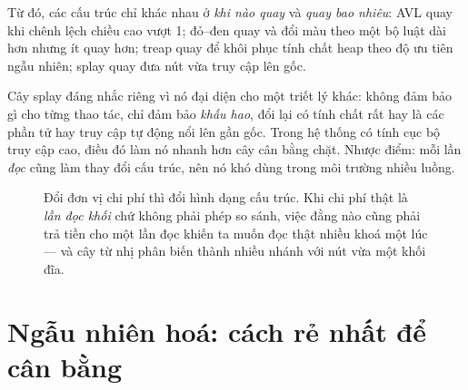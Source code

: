 \documentclass[../../algorithm.tex]{subfiles}
\begin{document}
Từ đó, các cấu trúc chỉ khác nhau ở \emph{khi nào quay} và \emph{quay bao nhiêu}: AVL quay khi chênh lệch chiều cao vượt 1; đỏ--đen quay và đổi màu theo một bộ luật dài hơn nhưng ít quay hơn; treap quay để khôi phục tính chất heap theo độ ưu tiên ngẫu nhiên; splay quay đưa nút vừa truy cập lên gốc.

Cây splay đáng nhắc riêng vì nó đại diện cho một triết lý khác\cite{sleator1985}: không đảm bảo gì cho từng thao tác, chỉ đảm bảo  \emph{khấu hao}, đổi lại có tính chất rất hay là các phần tử hay truy cập tự động nổi lên gần gốc. Trong hệ thống có tính cục bộ truy cập cao, điều đó làm nó nhanh hơn cây cân bằng chặt. Nhược điểm: mỗi lần \emph{đọc} cũng làm thay đổi cấu trúc, nên nó khó dùng trong môi trường nhiều luồng.

\begin{figure}[H]\centering
{}
\caption{Đổi đơn vị chi phí thì đổi hình dạng cấu trúc. Khi chi phí thật là \emph{lần đọc khối} chứ không phải phép so sánh, việc đằng nào cũng phải trả tiền cho một lần đọc khiến ta muốn đọc thật nhiều khoá một lúc --- và cây từ nhị phân biến thành nhiều nhánh với nút vừa một khối đĩa.}
\label{fig:btree-vs-bst}
\end{figure}

\section{Ngẫu nhiên hoá: cách rẻ nhất để cân bằng}
\end{document}
